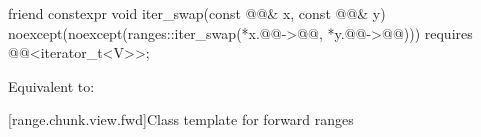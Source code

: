 %
\begin{itemdecl}
friend constexpr void iter_swap(const @@& x, const @@& y)
  noexcept(noexcept(ranges::iter_swap(*x.@@->@@, *y.@@->@@)))
  requires @@<iterator_t<V>>;
\end{itemdecl}

\begin{itemdescr}
\pnum
\effects
Equivalent to: 
\end{itemdescr}

[range.chunk.view.fwd]{Class template  for forward ranges}


